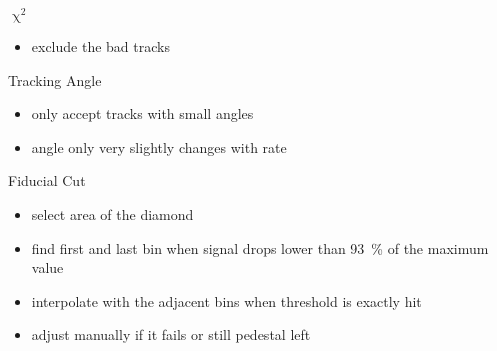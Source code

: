 \begin{frame}{$\upchi^2$}

	
	\begin{itemize}\itemfill
		\item exclude the bad tracks
	\end{itemize}
		
\end{frame}
\begin{frame}{Tracking Angle}

	
	\begin{itemize}\itemfill
		\item only accept tracks with small angles
		\item<2-> angle only very slightly changes with rate
	\end{itemize}
		
\end{frame}
\begin{frame}{Fiducial Cut}

	
	\begin{itemize}\itemfill
		\item select area of the diamond
		\item find first and last bin when signal drops lower than \SI{93}{\%} of the maximum value
		\item interpolate with the adjacent bins when threshold is exactly hit
		\item adjust manually if it fails or still pedestal left
	\end{itemize}
		
\end{frame}
